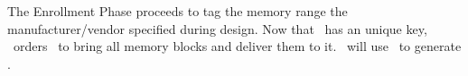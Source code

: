 The Enrollment Phase proceeds to tag the memory range the manufacturer\slash{}vendor specified during design. Now that \ptaggen~has an unique key, \seceng~orders \handler~to bring all memory blocks and deliver them to it. \seceng~will use \ptaggen~to generate \ptags.%




